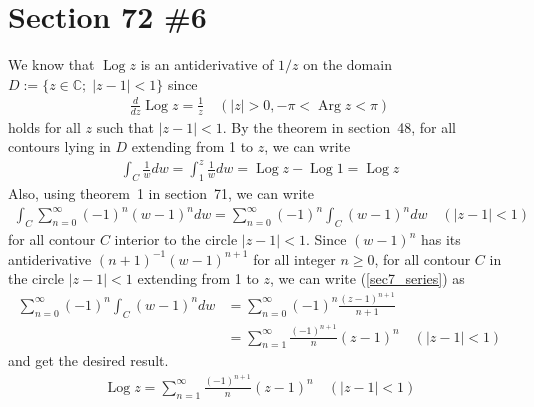 \documentclass{scrartcl}
\begin{document}
\section{Section 72 \#6}
We know that \(\operatorname{Log} z\) is an antiderivative of \(1 / z\) on the domain \(D := \{z \in \mathbb{C};\; |z - 1| < 1\}\) since
\begin{align*}
  \frac{d}{dz} \operatorname{Log} z = \frac{1}{z} \quad (|z| > 0, -\pi < \operatorname{Arg} z < \pi)
\end{align*}
holds for all \(z\) such that \(|z - 1| < 1\).
By the theorem in section~48, for all contours lying in \(D\) extending from 1 to \(z\), we can write
\begin{align*}
  \int_C \frac{1}{w} dw
  = \int^z_1 \frac{1}{w} dw
  = \operatorname{Log} z - \operatorname{Log} 1
  = \operatorname{Log} z
\end{align*}
Also, using theorem~1 in section~71, we can write
\begin{align}
  \label{sec7_series} \int_C \sum^\infty_{n = 0} (-1)^n (w - 1)^n dw
  = \sum^\infty_{n = 0} (-1)^n \int_C (w - 1)^n dw \quad (|z - 1| < 1)
\end{align}
for all contour \(C\) interior to the circle \(|z - 1| < 1\).
Since \((w - 1)^n\) has its antiderivative \((n + 1)^{-1} (w - 1)^{n + 1}\) for all integer \(n \geq 0\), for all contour \(C\) in the circle \(|z - 1| < 1\) extending from 1 to \(z\), we can write (\ref{sec7_series}) as
\begin{align*}
  \sum^\infty_{n = 0} (-1)^n \int_C (w - 1)^n dw
  &= \sum^\infty_{n = 0} (-1)^n \frac{(z - 1)^{n + 1}}{n + 1} \\
  &= \sum^\infty_{n = 1} \frac{(-1)^{n + 1}}{n} (z - 1)^n \quad (|z - 1| < 1)
\end{align*}
and get the desired result.
\begin{align}\label{sec7_result}
  \operatorname{Log} z = \sum^\infty_{n = 1} \frac{(-1)^{n + 1}}{n} (z - 1)^n \quad (|z - 1| < 1)
\end{align}
\end{document}
